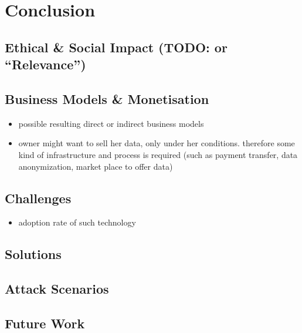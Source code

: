 \documentclass[12pt,english,a4paper,titlepage,cleardoublepage=empty,dottedtoc]{report}
\providecommand{\tightlist}{%
  \setlength{\itemsep}{0pt}\setlength{\parskip}{0pt}}
\begin{document}
\chapter{Conclusion}\label{conclusion}

\section{\texorpdfstring{Ethical \& Social Impact (TODO: or
``Relevance'')}{Ethical \& Social Impact (TODO: or Relevance)}}\label{ethical-social-impact-todo-or-relevance}

\section{Business Models \&
Monetisation}\label{business-models-monetisation}

\begin{itemize}
\tightlist
\item
  possible resulting direct or indirect business models
\item
  owner might want to sell her data, only under her conditions.
  therefore some kind of infrastructure and process is required (such as
  payment transfer, data anonymization, market place to offer data)
\end{itemize}

\section{Challenges}\label{challenges}

\begin{itemize}
\tightlist
\item
  adoption rate of such technology
\end{itemize}

\section{Solutions}\label{solutions}

\section{Attack Scenarios}\label{attack-scenarios}

\section{Future Work}\label{future-work}
\end{document}

